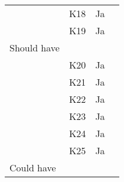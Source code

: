 \documentclass[class=article, crop=false]{standalone}
\begin{document}
\begin{table}[]
\begin{tabular}{llll}
            & K18      & Ja                 &                                                                                                                                                                                                    \\
            & K19      & Ja                 &                                                                                                                                                                                                    \\
            Should have     &          &                    &                                                                                                                                                                                                    \\
            & K20      & Ja                 &                                                                                                                                                                                                    \\
            & K21      & Ja                 &                                                                                                                                                                                                    \\
            & K22      & Ja                 &                                                                                                                                                                                                    \\
            & K23      & Ja                 &                                                                                                                                                                                                    \\
            & K24      & Ja                 &                                                                                                                                                                                                    \\
            & K25      & Ja                 &                                                                                                                                                                                                    \\
            Could have      &          &                    &                                                                                                                                                                                                    \\

\end{tabular}
\end{table}
\end{document}
